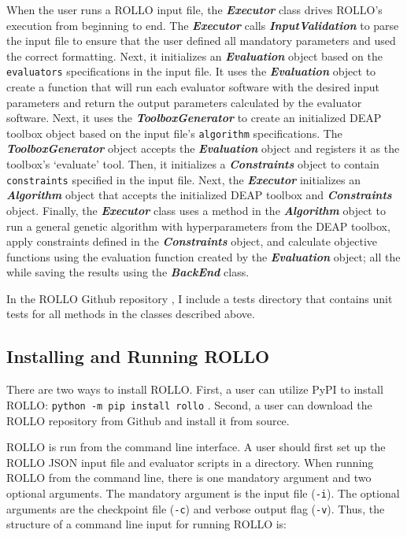 When the user runs a \gls{ROLLO} input file, the \textbf{\textit{Executor}} class 
drives \gls{ROLLO}'s execution from beginning to end.
The \textbf{\textit{Executor}} calls \textbf{\textit{InputValidation}} to 
parse the input file to ensure that the user defined all mandatory parameters
and used the correct formatting.
Next, it initializes an \textbf{\textit{Evaluation}} object based on the 
\texttt{evaluators} specifications in the input file. 
It uses the \textbf{\textit{Evaluation}} object to create a function that will 
run each evaluator software with the desired input parameters and return the 
output parameters calculated by the evaluator software. 
Next, it uses the \textbf{\textit{ToolboxGenerator}} to create an initialized 
DEAP toolbox object based on the input file's \texttt{algorithm} specifications. 
The \textbf{\textit{ToolboxGenerator}} object accepts the 
\textbf{\textit{Evaluation}} object and registers it as the toolbox's `evaluate' 
tool.  
Then, it initializes a \textbf{\textit{Constraints}} object to contain 
\texttt{constraints} specified in the input file. 
Next, the \textbf{\textit{Executor}} initializes an \textbf{\textit{Algorithm}} 
object that accepts the initialized \gls{DEAP} toolbox and \textbf{\textit{Constraints}} 
object. 
Finally, the \textbf{\textit{Executor}} class uses a method in the 
\textbf{\textit{Algorithm}} object to run a general genetic algorithm with 
hyperparameters from the \gls{DEAP} toolbox, apply constraints defined in the 
\textbf{\textit{Constraints}} object, and calculate objective functions using 
the evaluation function created by the \textbf{\textit{Evaluation}} object; all 
the while saving the results using the \textbf{\textit{BackEnd}} class. 

In the \gls{ROLLO} Github repository \cite{chee_rollo_2021}, I include a tests 
directory that contains unit tests for all methods in the classes described 
above. %

\subsection{Installing and Running ROLLO}
There are two ways to install \gls{ROLLO}.
First, a user can utilize \gls{PyPI} to install \gls{ROLLO}: \texttt{python -m 
pip install rollo}
\cite{chee_rollo_2021}.
Second, a user can download the \gls{ROLLO} repository \cite{chee_rollo_2021}
from Github and install it from source. 

\gls{ROLLO} is run from the command line interface. 
A user should first set up the \gls{ROLLO} JSON input file and evaluator 
scripts in a directory. 
When running \gls{ROLLO} from the command line, there is one mandatory argument and 
two optional arguments. 
The mandatory argument is the input file (\texttt{-i}). 
The optional arguments are the checkpoint file (\texttt{-c}) and verbose 
output flag (\texttt{-v}).  
Thus, the structure of a command line input for running \gls{ROLLO} is: 

